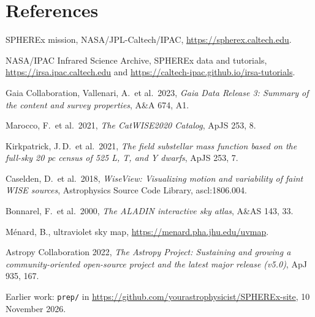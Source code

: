 \documentclass[11pt,a4paper]{article}
\newcommand{\Repo}{\url{https://github.com/yourastrophysicist/SPHEREx-site}}
\begin{document}
\section*{References}
\begin{enumerate}[label={[\arabic*]}, leftmargin=*]
  \item SPHEREx mission, NASA/JPL-Caltech/IPAC, \url{https://spherex.caltech.edu}.
  \item NASA/IPAC Infrared Science Archive, SPHEREx data and tutorials,
        \url{https://irsa.ipac.caltech.edu} and \url{https://caltech-ipac.github.io/irsa-tutorials}.
  \item Gaia Collaboration, Vallenari, A.\ et al.\ 2023, \textit{Gaia Data Release 3: Summary of
        the content and survey properties}, A\&A 674, A1.
  \item Marocco, F.\ et al.\ 2021, \textit{The CatWISE2020 Catalog}, ApJS 253, 8.
  \item Kirkpatrick, J.\,D.\ et al.\ 2021, \textit{The field substellar mass function based on
        the full-sky 20 pc census of 525 L, T, and Y dwarfs}, ApJS 253, 7.
  \item Caselden, D.\ et al.\ 2018, \textit{WiseView: Visualizing motion and variability of faint
        WISE sources}, Astrophysics Source Code Library, ascl:1806.004.
  \item Bonnarel, F.\ et al.\ 2000, \textit{The ALADIN interactive sky atlas}, A\&AS 143, 33.
  \item M\'enard, B., ultraviolet sky map, \url{https://menard.pha.jhu.edu/uvmap}.
  \item Astropy Collaboration 2022, \textit{The Astropy Project: Sustaining and growing a
        community-oriented open-source project and the latest major release (v5.0)}, ApJ 935, 167.
  \item Earlier work: \texttt{prep/} in \Repo, 10 November 2026.
\end{enumerate}
\end{document}

